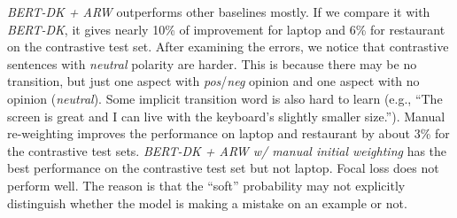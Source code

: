\emph{BERT-DK + ARW} outperforms other baselines mostly. If we compare it with \emph{BERT-DK}, it gives nearly 10\% of improvement for laptop and 6\% for restaurant on the contrastive test set.
After examining the errors, we notice that contrastive sentences with \emph{neutral} polarity are harder. This is because there may be no transition, but just one aspect with \emph{pos}/\emph{neg} opinion and one aspect with no opinion (\emph{neutral}).
Some implicit transition word is also hard to learn (e.g., ``The screen is great and I can live with the keyboard's slightly smaller size.''). 
Manual re-weighting improves the performance on laptop and restaurant by about 3\% for the contrastive test sets.
\emph{BERT-DK + ARW w/ manual initial weighting} has the best performance on the contrastive test set but not laptop.
Focal loss does not perform well. The reason is that the ``soft'' probability may not explicitly distinguish whether the model is making a mistake on an example or not. %
